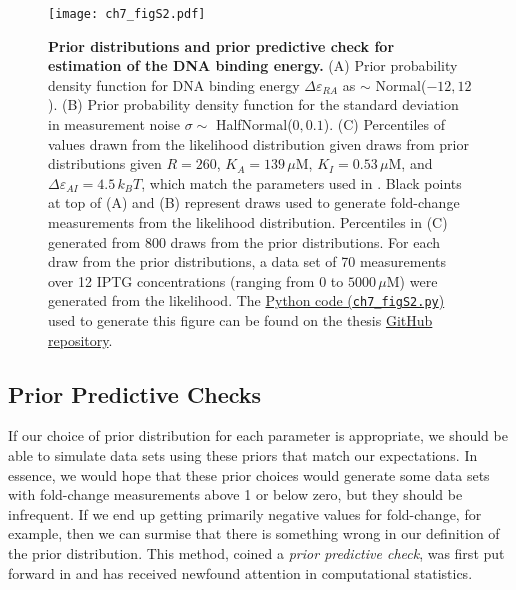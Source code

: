 \documentclass[12pt]{caltech_thesis}
\begin{document}
\hypertarget{fig:epRA_prior_pred}{%
\begin{figure}
\centering
\texttt{[image: ch7\_figS2.pdf]}
\caption[{Prior distributions and prior predictive check for estimation
of the DNA binding energy.}]{\textbf{Prior distributions and prior
predictive check for estimation of the DNA binding energy.} (A) Prior
probability density function for DNA binding energy
\(\Delta\varepsilon_{RA}\) as \(\sim\) Normal(\(-12, 12\)). (B) Prior
probability density function for the standard deviation in measurement
noise \(\sigma \sim\) HalfNormal(\(0, 0.1\)). (C) Percentiles of values
drawn from the likelihood distribution given draws from prior
distributions given \(R=260\), \(K_A=139 \,\mu\)M, \(K_I=0.53\,\mu\)M,
and \(\Delta\varepsilon_{AI} = 4.5\,k_BT\), which match the parameters
used in \textcite{razo-mejia2018}. Black points at top of (A) and (B)
represent draws used to generate fold-change measurements from the
likelihood distribution. Percentiles in (C) generated from 800 draws
from the prior distributions. For each draw from the prior
distributions, a data set of 70 measurements over 12 IPTG concentrations
(ranging from \(0\) to \(5000\,\mu\)M) were generated from the
likelihood. The
\href{https://github.com/gchure/phd/blob/master/src/chapter_07/code/ch7_figS2.py}{Python
code (\texttt{ch7\_figS2.py})} used to generate this figure can be found
on the thesis \href{https://github.com/gchure/phd}{GitHub repository}.}
\label{fig:epRA_prior_pred}
\end{figure}
}

\hypertarget{prior-predictive-checks}{%
\subsection{Prior Predictive Checks}\label{prior-predictive-checks}}

If our choice of prior distribution for each parameter is appropriate,
we should be able to simulate data sets using these priors that match
our expectations. In essence, we would hope that these prior choices
would generate some data sets with fold-change measurements above 1 or
below zero, but they should be infrequent. If we end up getting
primarily negative values for fold-change, for example, then we can
surmise that there is something wrong in our definition of the prior
distribution. This method, coined a \emph{prior predictive check}, was
first put forward in \textcite{good1950} and has received newfound
attention in computational statistics.
\end{document}
